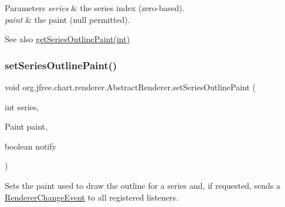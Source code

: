 \begin{DoxyParams}{Parameters}
{\em series} & the series index (zero-\/based). \\
\hline
{\em paint} & the paint ({\ttfamily null} permitted).\\
\hline
\end{DoxyParams}
\begin{DoxySeeAlso}{See also}
\mbox{\hyperlink{classorg_1_1jfree_1_1chart_1_1renderer_1_1_abstract_renderer_a984ad77afa8a897e282eb6c8d91f0f25}{get\+Series\+Outline\+Paint(int)}} 
\end{DoxySeeAlso}
\mbox{\label{classorg_1_1jfree_1_1chart_1_1renderer_1_1_abstract_renderer_a2ca55e3eea1cb35db72fa0c9688fca84}} 
\subsubsection{\texorpdfstring{set\+Series\+Outline\+Paint()}{setSeriesOutlinePaint()}\hspace{0.1cm}{\footnotesize\ttfamily [2/2]}}
{\footnotesize\ttfamily void org.\+jfree.\+chart.\+renderer.\+Abstract\+Renderer.\+set\+Series\+Outline\+Paint (\begin{DoxyParamCaption}\item[{int}]{series,  }\item[{Paint}]{paint,  }\item[{boolean}]{notify }\end{DoxyParamCaption})}

Sets the paint used to draw the outline for a series and, if requested, sends a \mbox{\hyperlink{}{Renderer\+Change\+Event}} to all registered listeners.


